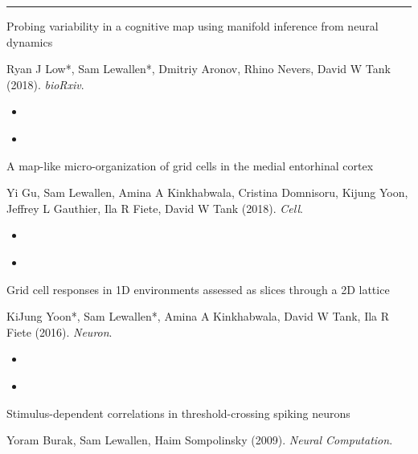 \documentclass[11pt]{article}
\def\tightlist{}
\begin{document}
\begin{center}\rule{0.5\linewidth}{\linethickness}\end{center}

\hypertarget{publications}{}
Probing variability in a cognitive map using manifold inference from
neural dynamics

Ryan J Low*, Sam Lewallen*, Dmitriy Aronov, Rhino Nevers, David W Tank
(2018). \emph{bioRxiv}.

\begin{itemize}
\tightlist
\item
  \href{https://www.biorxiv.org/content/early/2018/09/20/418939}{\emph{}}
\item
  \href{/pdf/Low_Lewallen_et_al_2018_Probing_variability_in_a_cognitive_map_using_manifold_inference_from_neural.pdf}{\emph{}}
\end{itemize}

A map-like micro-organization of grid cells in the medial entorhinal
cortex

Yi Gu, Sam Lewallen, Amina A Kinkhabwala, Cristina Domnisoru, Kijung
Yoon, Jeffrey L Gauthier, Ila R Fiete, David W Tank (2018). \emph{Cell}.

\begin{itemize}
\tightlist
\item
  \href{https://www.sciencedirect.com/science/article/pii/S009286741831167X}{\emph{}}
\item
  \href{/pdf/Gu_et_al_2018_A_Map-like_Micro-Organization_of_Grid_Cells_in_the_Medial_Entorhinal_Cortex.pdf}{\emph{}}
\end{itemize}

Grid cell responses in 1D environments assessed as slices through a 2D
lattice

KiJung Yoon*, Sam Lewallen*, Amina A Kinkhabwala, David W Tank, Ila R
Fiete (2016). \emph{Neuron}.

\begin{itemize}
\tightlist
\item
  \href{https://www.sciencedirect.com/science/article/pii/S0896627316000647}{\emph{}}
\item
  \href{/pdf/Yoon_et_al_2016_Grid_Cell_Responses_in_1D_Environments_Assessed_as_Slices.pdf}{\emph{}}
\end{itemize}

Stimulus-dependent correlations in threshold-crossing spiking neurons

Yoram Burak, Sam Lewallen, Haim Sompolinsky (2009). \emph{Neural
Computation}.
\end{document}
